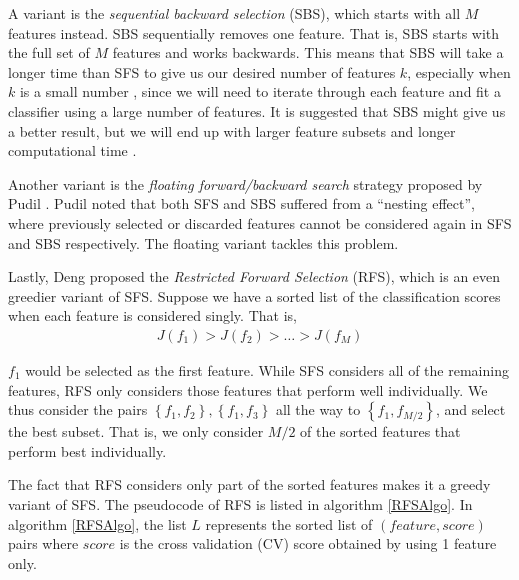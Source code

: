 \documentclass[12pt, twoside, a4paper]{report}
\begin{document}
A variant is the \textit{sequential backward selection} (SBS), which starts with all $M$ features instead. SBS sequentially removes one feature. That is, SBS starts with the full set of $M$ features and works backwards. This means that SBS will take a longer time than SFS to give us our desired number of features $k$, especially when $k$ is a small number \cite{RefWorks:190}, since we will need to iterate through each feature and fit a classifier using a large number of features. It is suggested that SBS might give us a better result, but we will end up with larger feature subsets and longer computational time \cite{RefWorks:208}.

Another variant is the \textit{floating forward/backward search} strategy proposed by Pudil \cite{RefWorks:178}. Pudil noted that both SFS and SBS suffered from a ``nesting effect'', where previously selected or discarded features cannot be considered again in SFS and SBS respectively. The floating variant tackles this problem.

Lastly, Deng \cite{deng1998omega} proposed the \textit{Restricted Forward Selection} (RFS), which is an even greedier variant of SFS. Suppose we have a sorted list of the classification scores when each feature is considered singly. That is,
\begin{align*}
J(f_1) > J(f_2) > \dots > J(f_M)
\end{align*}

$f_1$ would be selected as the first feature. While SFS considers all of the remaining features, RFS only considers those features that perform well individually. We thus consider the pairs $\left\lbrace f_1, f_2 \right\rbrace, \left\lbrace f_1, f_3 \right\rbrace$ all the way to $\left\lbrace f_1, f_{M/2} \right\rbrace$, and select the best subset. That is, we only consider $M/2$ of the sorted features that perform best individually.

The fact that RFS considers only part of the sorted features makes it a greedy variant of SFS. The pseudocode of RFS is listed in algorithm \ref{RFSAlgo}. In algorithm \ref{RFSAlgo}, the list $L$ represents the sorted list of $(feature, score)$ pairs where $score$ is the cross validation (CV) score obtained by using 1 feature only.
\end{document}
